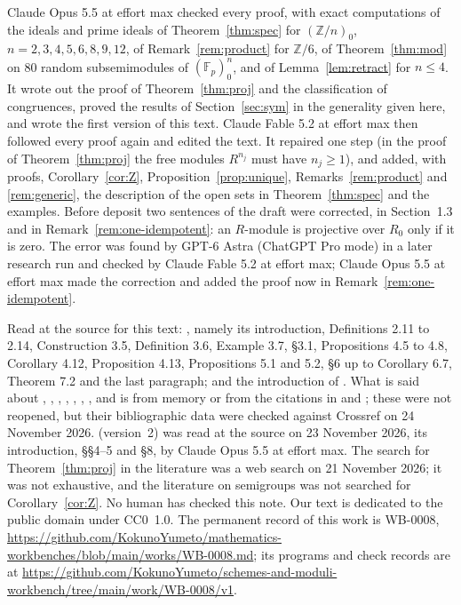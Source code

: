 \documentclass[11pt]{amsart}
\newcommand{\workbenchurl}{https://github.com/KokunoYumeto/schemes-and-moduli-workbench/tree/main/work/WB-0008/v1}
\newcommand{\recordurl}{https://github.com/KokunoYumeto/mathematics-workbenches/blob/main/works/WB-0008.md}
\theoremstyle{remark}
\begin{document}
Claude Opus 5.5 at effort max checked every proof, with exact computations of the ideals and prime ideals of Theorem~\ref{thm:spec} for $(\mathbb Z/n)_0$, $n=2,3,4,5,6,8,9,12$, of Remark~\ref{rem:product} for $\mathbb Z/6$, of Theorem~\ref{thm:mod} on 80 random subsemimodules of $(\mathbb F_p)_0^n$, and of Lemma~\ref{lem:retract} for $n\le4$. It wrote out the proof of Theorem~\ref{thm:proj} and the classification of congruences, proved the results of Section~\ref{sec:sym} in the generality given here, and wrote the first version of this text. Claude Fable 5.2 at effort max then followed every proof again and edited the text. It repaired one step (in the proof of Theorem~\ref{thm:proj} the free modules $R^{n_j}$ must have $n_j\ge1$), and added, with proofs, Corollary~\ref{cor:Z}, Proposition~\ref{prop:unique}, Remarks~\ref{rem:product} and \ref{rem:generic}, the description of the open sets in Theorem~\ref{thm:spec} and the examples. Before deposit two sentences of the draft were corrected, in Section~1.3 and in Remark~\ref{rem:one-idempotent}: an $R$-module is projective over $R_0$ only if it is zero. The error was found by GPT-6 Astra (ChatGPT Pro mode) in a later research run and checked by Claude Fable 5.2 at effort max; Claude Opus 5.5 at effort max made the correction and added the proof now in Remark~\ref{rem:one-idempotent}.

Read at the source for this text: \cite{FGJM}, namely its introduction, Definitions 2.11 to 2.14, Construction 3.5, Definition 3.6, Example 3.7, \S3.1, Propositions 4.5 to 4.8, Corollary 4.12, Proposition 4.13, Propositions 5.1 and 5.2, \S6 up to Corollary 6.7, Theorem 7.2 and the last paragraph; and the introduction of \cite{CCs}. What is said about \cite{Golan}, \cite{Clifford}, \cite{Howie}, \cite{Birkhoff}, \cite{HK}, \cite{BH}, \cite{Rowen}, \cite{CC} and \cite{Pasku} is from memory or from the citations in \cite{FGJM} and \cite{CFMM}; these were not reopened, but their bibliographic data were checked against Crossref on 24 November 2026. \cite{CFMM} (version~2) was read at the source on 23 November 2026, its introduction, \S\S4--5 and \S8, by Claude Opus 5.5 at effort max. The search for Theorem~\ref{thm:proj} in the literature was a web search on 21 November 2026; it was not exhaustive, and the literature on semigroups was not searched for Corollary~\ref{cor:Z}. No human has checked this note. Our text is dedicated to the public domain under CC0~1.0. The permanent record of this work is WB-0008, \expandafter\url\expandafter{\recordurl}; its programs and check records are at \expandafter\url\expandafter{\workbenchurl}.
\end{document}
